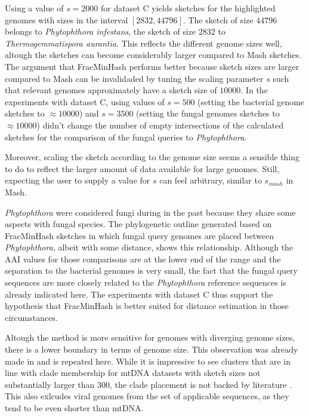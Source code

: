 Using a value of $s=2000$ for dataset C yields sketches for the highlighted
genomes with sizes in the interval $[2832, 44796]$. The sketch of size $44796$
belongs to \textit{Phytophthora infestans}, the sketch of size $2832$ to
\textit{Thermogemmatispora aurantia}. This reflects the different genome sizes
well, altough the sketches can become considerably larger compared to Mash
sketches. The argument that FracMinHash performs better because sketch sizes
are larger compared to Mash can be invalidaded by tuning the scaling parameter
$s$ such that relevant genomes approximately have a sketch size of $10000$. In
the experiments with dataset C, using values of $s=500$ (setting the bacterial
genome sketches to $\approx 10000$) and $s=3500$ (setting the fungal genomes
sketches to $\approx 10000$) didn't change the number of empty intersections of
the calculated sketches for the comparison of the fungal queries to
\textit{Phytophthora}. 

Moreover, scaling the sketch according to the genome size seems a sensible thing
to do to reflect the larger amount of data available for large genomes. Still,
expecting the user to supply a value for $s$ can feel arbitrary, similar to
$s_{mash}$ in Mash.

\textit{Phytophthora} were considered fungi during in the past because they
share some aspects with fungal species. The phylogenetic outline
generated based on FracMinHash sketches in which fungal query genomes are placed
between \textit{Phytophthora}, albeit with some distance, shows this
relationship. Although the AAI values for those comparisons are at the lower end
of the range and the separation to the bacterial genomes is very small, the fact
that the fungal query sequences are more closely related to the
\textit{Phytophthora} reference sequences is already indicated here. The
experiments with dataset C thus support the hypothesis that FracMinHash is
better suited for distance estimation in those circumstances.

Altough the method is more sensitive for genomes with diverging genome sizes,
there is a lower boundary in terms of genome size. This observation was already
made in
\cite{irberLightweightCompositionalAnalysis2022,heraDebiasingFracMinHashDeriving2023}
and is repeated here. While it is impressive to see clusters that are in line
with clade membership for mtDNA datasets with sketch sizes not substantially
larger than $300$, the clade placement is not backed by literature
\cite{winkworthComparativeAnalysesComplete2022,abadPhytophthoraTaxonomicPhylogenetic2023a,
yangExpandedPhylogenyGenus2017}. This also exlcudes viral genomes from the set
of applicable sequences, as they tend to be even shorter  than mtDNA.

